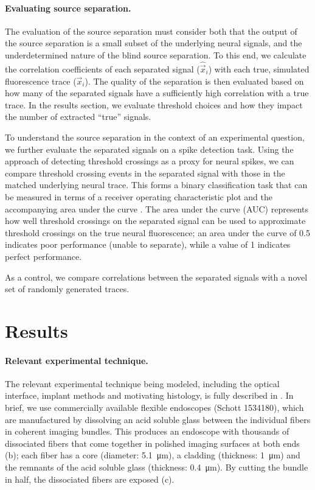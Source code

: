 \paragraph{Evaluating source separation.} The evaluation of the source separation must consider both that the output of the source separation is a small subset of the underlying neural signals, and the underdetermined nature of the blind source separation. To this end, we calculate the correlation coefficients of each separated signal ($\hat{\vec{x}}_i$) with each true, simulated fluorescence trace ($\vec{x}_i$). The quality of the separation is then evaluated based on how many of the separated signals have a sufficiently high correlation with a true trace. In the results section, we evaluate threshold choices and how they impact the number of extracted ``true'' signals.

To understand the source separation in the context of an experimental question, we further evaluate the separated signals on a spike detection task. Using the approach of detecting threshold crossings as a proxy for neural spikes, we can compare threshold crossing events in the separated signal with those in the matched underlying neural trace. This forms a binary classification task that can be measured in terms of a receiver operating characteristic plot and the accompanying area under the curve \cite{Hanley:te}. The area under the curve (AUC) represents how well threshold crossings on the separated signal can be used to approximate threshold crossings on the true neural fluorescence; an area under the curve of 0.5 indicates poor performance (unable to separate), while a value of 1 indicates perfect performance.

As a control, we compare correlations between the separated signals with a novel set of randomly generated traces.

\section{Results}
\label{sec:results-modeling}

\paragraph{Relevant experimental technique.} The relevant experimental technique being modeled, including the optical interface, implant methods and motivating histology, is fully described in . In brief, we use commercially available flexible endoscopes (Schott 1534180), which are manufactured by dissolving an acid soluble glass between the individual fibers in coherent imaging bundles. This produces an endoscope with thousands of dissociated fibers that come together in polished imaging surfaces at both ends (b); each fiber has a core (diameter: 5.1~\si{\micro\meter}), a cladding (thickness: 1~\si{\micro\meter}) and the remnants of the acid soluble glass (thickness: 0.4~\si{\micro\meter}). By cutting the bundle in half, the dissociated fibers are exposed (c). 

